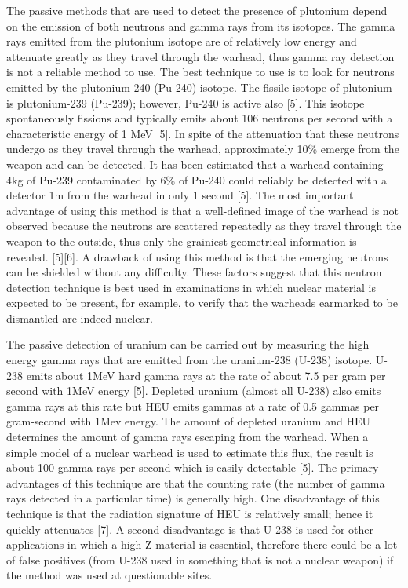 \documentclass[twocolumn,a4paper]{article}
\begin{document}
The passive methods that are used to detect the presence of plutonium depend on the
emission of both neutrons and gamma rays from its isotopes. The gamma rays emitted from the
plutonium isotope are of relatively low energy and attenuate greatly as they travel through the
warhead, thus gamma ray detection is not a reliable method to use. The best technique to use is
to look for neutrons emitted by the plutonium-240 (Pu-240) isotope. The fissile isotope of
plutonium is plutonium-239 (Pu-239); however, Pu-240 is active also [5]. This isotope
spontaneously fissions and typically emits about 106 neutrons per second with a characteristic
energy of 1 MeV [5]. In spite of the attenuation that these neutrons undergo as they travel
through the warhead, approximately 10\% emerge from the weapon and can be detected. It has
been estimated that a warhead containing 4kg of Pu-239 contaminated by 6\% of Pu-240 could
reliably be detected with a detector 1m from the warhead in only 1 second [5]. The most
important advantage of using this method is that a well-defined image of the warhead is not
observed because the neutrons are scattered repeatedly as they travel through the weapon to the
outside, thus only the grainiest geometrical information is revealed. [5][6]. A drawback of using
this method is that the emerging neutrons can be shielded without any difficulty. These factors
suggest that this neutron detection technique is best used in examinations in which nuclear
material is expected to be present, for example, to verify that the warheads earmarked to be
dismantled are indeed nuclear.

The passive detection of uranium can be carried out by measuring the high energy
gamma rays that are emitted from the uranium-238 (U-238) isotope. U-238 emits about 1MeV
hard gamma rays at the rate of about 7.5 per gram per second with 1MeV energy [5]. Depleted
uranium (almost all U-238) also emits gamma rays at this rate but HEU emits gammas at a rate
of 0.5 gammas per gram-second with 1Mev energy. The amount of depleted uranium and HEU
determines the amount of gamma rays escaping from the warhead. When a simple model of a
nuclear warhead is used to estimate this flux, the result is about 100 gamma rays per second
which is easily detectable [5]. The primary advantages of this technique are that the counting rate
(the number of gamma rays detected in a particular time) is generally high. One disadvantage of
this technique is that the radiation signature of HEU is relatively small; hence it quickly
attenuates [7]. A second disadvantage is that U-238 is used for other applications in which a high
Z material is essential, therefore there could be a lot of false positives (from U-238 used in
something that is not a nuclear weapon) if the method was used at questionable sites.
\end{document}
